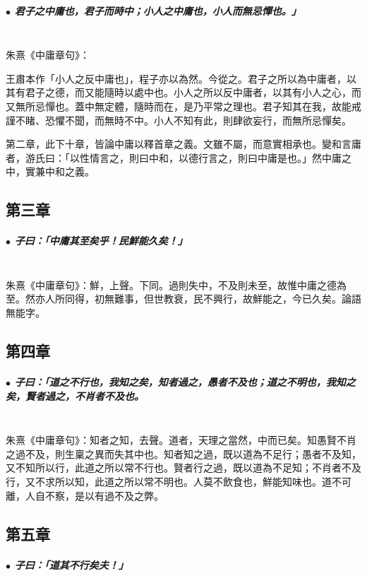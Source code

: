 \documentclass[hyperref, UTF8, 12pt, a4paper]{ctexrep}
\begin{document}
\subparagraph{$\bullet$ 君子之中庸也，君子而時中；小人之中庸也，小人而無忌憚也。」} ~\\

朱熹《中庸章句》：

\begin{adjustwidth}{2cm}{1cm}
\indent\indent 王肅本作「小人之反中庸也」，程子亦以為然。今從之。君子之所以為中庸者，以其有君子之德，而又能隨時以處中也。小人之所以反中庸者，以其有小人之心，而又無所忌憚也。蓋中無定體，隨時而在，是乃平常之理也。君子知其在我，故能戒謹不睹、恐懼不聞，而無時不中。小人不知有此，則肆欲妄行，而無所忌憚矣。

第二章，此下十章，皆論中庸以釋首章之義。文雖不屬，而意實相承也。變和言庸者，游氏曰：「以性情言之，則曰中和，以德行言之，則曰中庸是也。」然中庸之中，實兼中和之義。
\end{adjustwidth}

\newpage
\subsection{第三章}

\subparagraph{$\bullet$ 子曰：「中庸其至矣乎！民鮮能久矣！」} ~\\

朱熹《中庸章句》：鮮，上聲。下同。過則失中，不及則未至，故惟中庸之德為至。然亦人所同得，初無難事，但世教衰，民不興行，故鮮能之，今已久矣。論語無能字。

\newpage
\subsection{第四章}

\subparagraph{$\bullet$ 子曰：「道之不行也，我知之矣，知者過之，愚者不及也；道之不明也，我知之矣，賢者過之，不肖者不及也。} ~\\

朱熹《中庸章句》：知者之知，去聲。道者，天理之當然，中而已矣。知愚賢不肖之過不及，則生稟之異而失其中也。知者知之過，既以道為不足行；愚者不及知，又不知所以行，此道之所以常不行也。賢者行之過，既以道為不足知；不肖者不及行，又不求所以知，此道之所以常不明也。人莫不飲食也，鮮能知味也。道不可離，人自不察，是以有過不及之弊。

\newpage
\subsection{第五章}

\subparagraph{$\bullet$ 子曰：「道其不行矣夫！」} ~\\
\end{document}
